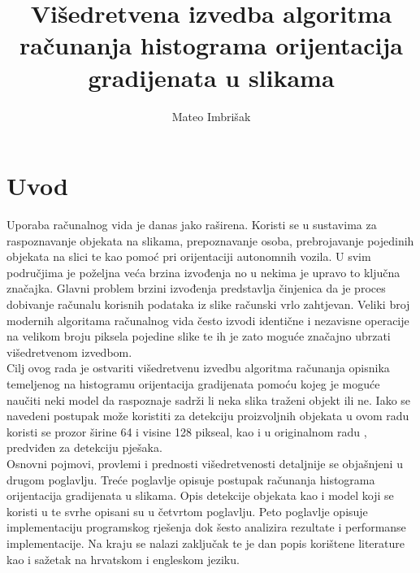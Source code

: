 \documentclass[times, utf8, zavrsni]{fer}
\begin{document}

\title{Višedretvena izvedba algoritma računanja histograma orijentacija gradijenata u slikama}

\author{Mateo Imbrišak}

\maketitle

\zahvala{}

\tableofcontents

\chapter{Uvod}
Uporaba računalnog vida je danas jako raširena. Koristi se u sustavima za raspoznavanje objekata na slikama, prepoznavanje osoba, prebrojavanje pojedinih objekata na slici te kao pomoć pri orijentaciji autonomnih vozila. U svim područjima je poželjna veća brzina izvođenja no u nekima je upravo to ključna značajka. Glavni problem brzini izvođenja predstavlja činjenica da je proces dobivanje računalu korisnih podataka iz slike računski vrlo zahtjevan. Veliki broj modernih algoritama računalnog vida često izvodi identične i nezavisne operacije na velikom broju piksela pojedine slike te ih je zato moguće značajno ubrzati višedretvenom izvedbom. \\

Cilj ovog rada je ostvariti višedretvenu izvedbu algoritma računanja opisnika temeljenog na histogramu orijentacija gradijenata pomoću kojeg je moguće naučiti neki model da raspoznaje sadrži li neka slika traženi objekt ili ne. Iako se navedeni postupak može koristiti za detekciju proizvoljnih objekata u ovom radu koristi se prozor širine 64 i visine 128 pikseal, kao i u originalnom radu \citep{dalal2005histograms}, predviđen za detekciju pješaka. \\

Osnovni pojmovi, provlemi i prednosti višedretvenosti detaljnije se objašnjeni u drugom poglavlju. Treće poglavlje opisuje postupak računanja histograma orijentacija gradijenata u slikama. Opis detekcije objekata kao i model koji se koristi u te svrhe opisani su u četvrtom poglavlju. Peto poglavlje opisuje implementaciju programskog rješenja dok šesto analizira rezultate i performanse implementacije. Na kraju se nalazi zaključak te je dan popis korištene literature kao i sažetak na hrvatskom i engleskom jeziku.
\end{document}
